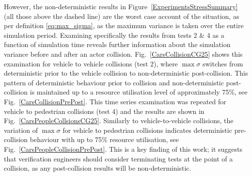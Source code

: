 \documentclass[letterpaper, 10 pt, journal, twoside]{IEEEtran}
\begin{document}
However, the non-deterministic results in Figure~\ref{ExperimentsStressSummary} (all those above the dashed line) are the worst case account of the situation, as per definition \ref{eq:max_sigma}, as the maximum variance is taken over the entire simulation period.
%
Examining specifically the results from tests 2 \& 4 as a function of simulation time reveals further information about the simulation variance before and after an actor collision. Fig.~\ref{CarsCollisionCG25} shows this examination for vehicle to vehicle collisions (test 2), where $\max\sigma$ switches from deterministic prior to the vehicle collision to non-deterministic post-collision. This pattern of deterministic behaviour prior to collision and non-deterministic post-collision is maintained up to a resource utilisation level of approximately 75\%, see Fig.~\ref{CarsCollisionPrePost}. This time series examination was repeated for vehicle to pedestrian collisions (test 4) and the results are shown in Fig.~\ref{CarsPeopleCollsionsCG25}. Similarly to vehicle-to-vehicle collisions, the variation of $\max\sigma$ for vehicle to pedestrian collisions indicates deterministic pre-collision behaviour with up to 75\% resource utilisation, see Fig.~\ref{CarsPeopleCollisionPrePost}. This is a key finding of this work; it suggests that verification engineers should consider terminating tests at the point of a collision, as any post-collision results will be non-deterministic. %
\end{document}
